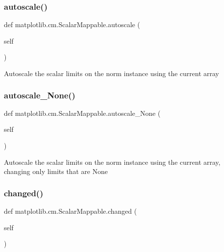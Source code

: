 \subsubsection{\texorpdfstring{autoscale()}{autoscale()}}
{\footnotesize\ttfamily def matplotlib.\+cm.\+Scalar\+Mappable.\+autoscale (\begin{DoxyParamCaption}\item[{}]{self }\end{DoxyParamCaption})}

\begin{DoxyVerb}Autoscale the scalar limits on the norm instance using the
current array
\end{DoxyVerb}
 \mbox{\label{classmatplotlib_1_1cm_1_1ScalarMappable_ae58e300a56fb0c17da9b7e050d1e08ae}} 
\subsubsection{\texorpdfstring{autoscale\+\_\+\+None()}{autoscale\_None()}}
{\footnotesize\ttfamily def matplotlib.\+cm.\+Scalar\+Mappable.\+autoscale\+\_\+\+None (\begin{DoxyParamCaption}\item[{}]{self }\end{DoxyParamCaption})}

\begin{DoxyVerb}Autoscale the scalar limits on the norm instance using the
current array, changing only limits that are None
\end{DoxyVerb}
 \mbox{\label{classmatplotlib_1_1cm_1_1ScalarMappable_a53e963849ca2b501fa1a25706fa58207}} 
\subsubsection{\texorpdfstring{changed()}{changed()}}
{\footnotesize\ttfamily def matplotlib.\+cm.\+Scalar\+Mappable.\+changed (\begin{DoxyParamCaption}\item[{}]{self }\end{DoxyParamCaption})}

